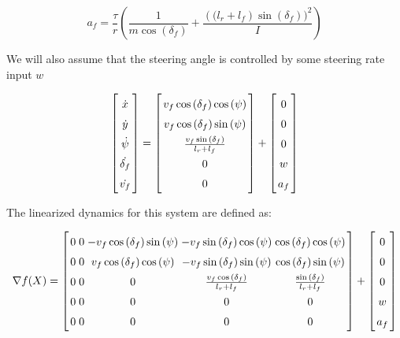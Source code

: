 \documentclass{article}
\theoremstyle{remark}
\theoremstyle{definition}
\begin{document}
$$ a_f = \frac{\tau}{r} \left ( \frac {1} {m \cos {( \delta_f) }} + \frac {\left((l_r+l_f\right)\sin {( \delta_f) } )^2} {I} \right ) $$

We will also assume that the steering angle is controlled by some steering rate input $w$


$$ \left \lbrack \arraycolsep=1.4pt\def\arraystretch{1.5} \begin{array}{c}
    \dot{x} \\
    \dot{y} \\
    \dot{\psi} \\
    \dot{\delta_f} \\
    \dot{v_f}
\end{array} \right \rbrack  = \left \lbrack \arraycolsep=1.4pt\def\arraystretch{1.5} \begin{array}{c}
    v_f \cos {( \delta_f) } \cos{( \psi )} \\
    v_f \cos {( \delta_f) } \sin{( \psi )} \\
    \frac {v_f \sin {( \delta_f) }} {l_r + l_f} \\
    0 \\
    0
\end{array} \right \rbrack + \left \lbrack \arraycolsep=1.4pt\def\arraystretch{1.5} \begin{array}{c}
    0 \\
    0 \\
    0 \\
    w \\
    a_f
\end{array} \right \rbrack $$

The linearized dynamics for this system are defined as:

$$ \nabla f(X)  = \left \lbrack \arraycolsep=1.4pt\def\arraystretch{1.5} \begin{array}{ccccc}
    0 & 0 & - v_f \cos {( \delta_f) } \sin{( \psi )} & -v_f \sin {( \delta_f) } \cos{( \psi )} & \cos {( \delta_f) } \cos{( \psi )}  \\
    0 & 0 & v_f \cos {( \delta_f) } \cos{( \psi )} & -v_f \sin {( \delta_f) } \sin{( \psi )} & \cos {( \delta_f) } \sin{( \psi )} \\
    0 & 0 & 0 & \frac {v_f \cos {( \delta_f) }} {l_r + l_f} & \frac {\sin {( \delta_f) }} {l_r + l_f} \\
    0 & 0 & 0 & 0 & 0 \\
    0 & 0 & 0 & 0 & 0 \\
\end{array} \right \rbrack + \left \lbrack \arraycolsep=1.4pt\def\arraystretch{1.5} \begin{array}{c}
    0 \\
    0 \\
    0 \\
    w \\
    a_f
\end{array} \right \rbrack $$
\end{document}
